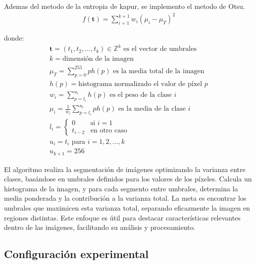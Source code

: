 \documentclass[conference]{IEEEtran}
\begin{document}
\noindent Ademas del metodo de la entropia de kapur, se implemento el metodo de Otsu.
\begin{equation}
	\begin{gathered}
		f(\mathbf{t})=\sum_{i=1}^{k+1} w_i (\mu_i - \mu_T)^2 
	\end{gathered}
	\label{eq9}
\end{equation}



donde:
\begin{equation}
	\begin{gathered}
		\mathbf{t} = (t_1, t_2, \dots, t_k) \in \mathbb{Z}^k \text{ es el vector de umbrales} \\
		k = \text{dimensión de la imagen} \\
		\mu_T = \sum_{p=0}^{255} p h(p) \text{ es la media total de la imagen} \\
		h(p) = \text{histograma normalizado el valor de píxel } p \\
		w_i = \sum_{p=l_i}^{u_i} h(p) \text{ es el peso de la clase } i \\
		\mu_i = \frac{1}{w_i} \sum_{p=l_i}^{u_i} p h(p) \text{ es la media de la clase } i \\
		l_i = \begin{cases}
			0 & \text{si } i = 1 \\
			t_{i-2} & \text{en otro caso}
		\end{cases} \\
		u_i = t_i \text{ para } i = 1, 2, \dots, k \\
		u_{k+1} = 256
	\end{gathered}
	\label{eq9}
\end{equation}

\noindent El algoritmo realiza la segmentación de imágenes optimizando la varianza entre clases, basándose en umbrales definidos para los valores de los píxeles. Calcula un histograma de la imagen, y para cada segmento entre umbrales, determina la media ponderada y la contribución a la varianza total. La meta es encontrar los umbrales que maximicen esta varianza total, separando eficazmente la imagen en regiones distintas. Este enfoque es útil para destacar características relevantes dentro de las imágenes, facilitando su análisis y procesamiento.






\subsection{Configuración experimental}
\end{document}

